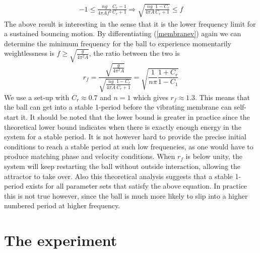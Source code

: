 \documentclass[12pt,oneside,a4paper]{article}
\numberwithin{equation}{section}
\begin{document}
{{{{\begin{align}
	-1 \le \frac{ng}{4\pi Af^2 }\frac{C_r-1}{C_r+1} \Rightarrow \sqrt{\frac{ng}{4\pi A}\frac{1-C_r}{C_r+1}} \le f
\end{align}
The above result is interesting in the sense that it is the lower frequency 
limit for a sustained bouncing motion. By differentiating (\ref{membranev}) 
again we can determine the minimum frequency for the ball to experience 
momentarily weightlessness is $f\ge\sqrt{\frac{g}{4\pi^2A}}$, the ratio between 
the two is
\begin{equation}
	r_f=\frac{\sqrt{\frac{g}{4\pi^2A}}}{\sqrt{\frac{ng}{4\pi A}\frac{1-C_r}{C_r+1}}} = \sqrt{\frac{1}{n\pi} \frac{1+C_r}{1-C_1}}
\end{equation}
We use a set-up with $C_r\approx 0.7$ and $n=1$ which gives $r_f\approx1.3$. 
This means that the ball can get into a stable 1-period before the vibrating 
membrane can self-start it. It should be noted that the lower bound is greater 
in practice since the theoretical lower bound indicates when there is exactly 
enough energy in the system for a stable period. It is not however hard to 
provide the precise initial conditions to reach a stable period at such low 
frequencies, as one would have to produce matching phase and velocity 
conditions. When $r_f$ is below unity, the system will keep restarting the ball 
without outside interaction, allowing the attractor to take over. Also this 
theoretical analysis suggests that a stable 1-period exists for all parameter 
sets that satisfy the above equation. In practice this is not true however, 
since the ball is much more likely to slip into a higher numbered period at 
higher frequency. 
\section{The experiment}
\label{expsetup}
}}}}
\end{document}

